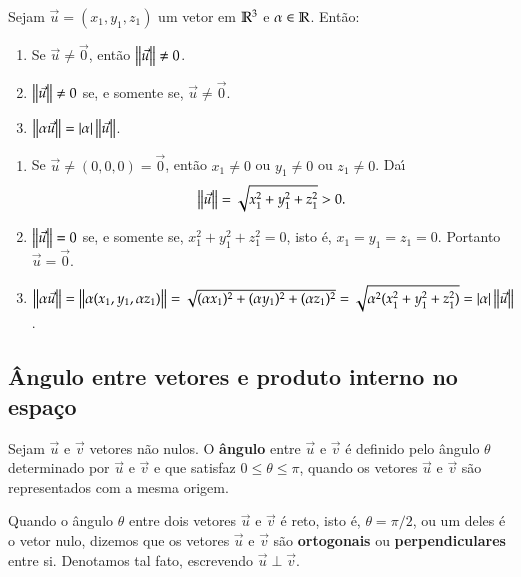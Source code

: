 \begin{proposicao}
  Sejam $\vec{u} = (x_1, y_1,z_1)$ um vetor em $\mathbb{R}^3$ e $\alpha \in \mathbb{R}$. Ent\~ao:
  \begin{enumerate}
    \item Se $\vec{u} \ne \vec{0}$, ent\~ao $\left\Vert{\vec{u}}\right\Vert \ne 0$.
    \item $\left\Vert{\vec{u}}\right\Vert \ne 0$ se, e somente se, $\vec{u} \ne \vec{0}$.
    \item $\left\Vert{\alpha\vec{u}}\right\Vert = |\alpha|\left\Vert{\vec{u}}\right\Vert$.
  \end{enumerate}
\end{proposicao}
\begin{prova}
  \begin{enumerate}
    \item  Se $\vec{u} \ne (0,0,0) = \vec{0}$, ent\~ao $x_1 \ne 0$ ou $y_1 \ne 0$ ou $z_1 \ne 0$. Da{\'\i}
    \[
      \left\Vert{\vec{u}}\right\Vert = \sqrt{x_1^2 + y_1^2 + z_1^2} > 0.
    \]
    \item $\left\Vert{\vec{u}}\right\Vert = 0$ se, e somente se, $x_1^2 + y_1^2 + z_1^2 = 0$, isto \'e, $x_1 = y_1 = z_1 = 0$. Portanto $\vec{u} = \vec{0}$.
    \item $\left\Vert{\alpha\vec{u}}\right\Vert = \left\Vert{\alpha(x_1, y_1, \alpha z_1)}\right\Vert = \sqrt{(\alpha x_1)^2 + (\alpha y_1)^2 + (\alpha z_1)^2} = \sqrt{\alpha^2(x_1^2 + y_1^2 + z_1^2)} = |\alpha|\left\Vert{\vec{u}}\right\Vert$.
  \end{enumerate}
\end{prova}

\subsection{\^Angulo entre vetores e produto interno no espa\c{c}o} %
\label{sub:angulo_entre_vetores_e_produto_interno_no_espaco}
\begin{definicao}
  Sejam $\vec{u}$ e $\vec{v}$ vetores n\~ao nulos. O \textbf{\^angulo} entre $\vec{u}$ e $\vec{v}$ \'e definido pelo \^angulo $\theta$ determinado por $\vec{u}$ e $\vec{v}$ e que satisfaz $0 \le \theta \le \pi$, quando os vetores $\vec{u}$ e $\vec{v}$ s\~ao representados com a mesma origem.
\end{definicao}

\begin{definicao}
  Quando o \^angulo $\theta$ entre dois vetores $\vec{u}$ e $\vec{v}$ \'e reto, isto \'e, $\theta = \pi/2$, ou um deles \'e o vetor nulo, dizemos que os vetores $\vec{u}$ e $\vec{v}$ s\~ao \textbf{ortogonais} ou \textbf{perpendiculares} entre si. Denotamos tal fato, escrevendo $\vec{u} \perp \vec{v}$.
\end{definicao}

